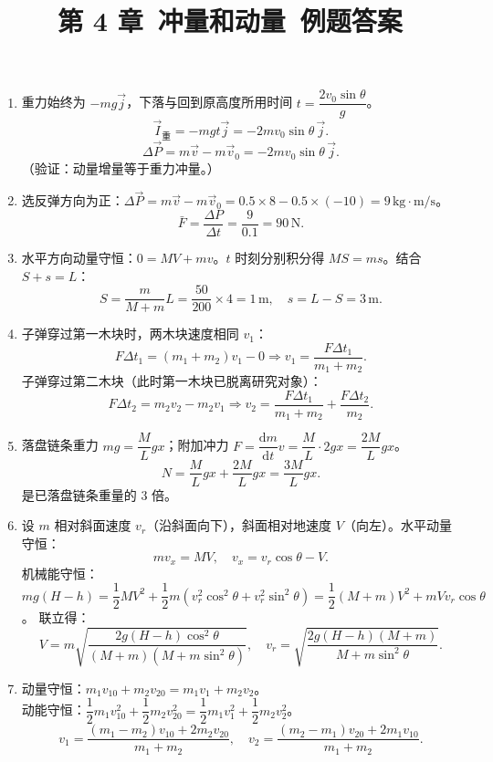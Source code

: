 \documentclass[12pt]{article}
\title{第 4 章\ 冲量和动量\ 例题答案}
\author{}
\date{}
\begin{document}
\maketitle

\begin{enumerate}[label=\textbf{例\arabic*.}, leftmargin=*]

\item 重力始终为 $-mg\vec{j}$，下落与回到原高度所用时间 $t = \dfrac{2v_0\sin\theta}{g}$。
\[
  \vec{I}_{重} = -mg t \vec{j} = -2mv_0\sin\theta\,\vec{j}.
\]
\[
  \Delta\vec{P} = m\vec{v} - m\vec{v}_0 = -2mv_0\sin\theta\,\vec{j}.
\]
（验证：动量增量等于重力冲量。）

\item 选反弹方向为正：$\Delta\vec{P} = m\vec{v} - m\vec{v}_0 = 0.5 \times 8 - 0.5 \times (-10) = 9\,\mathrm{kg\cdot m/s}$。
\[
  \bar{F} = \frac{\Delta P}{\Delta t} = \frac{9}{0.1} = 90\,\mathrm{N}.
\]

\item 水平方向动量守恒：$0 = M V + m v$。$t$ 时刻分别积分得 $MS = ms$。结合 $S + s = L$：
\[
  S = \frac{m}{M + m}L = \frac{50}{200} \times 4 = 1\,\mathrm{m},\quad s = L - S = 3\,\mathrm{m}.
\]

\item 子弹穿过第一木块时，两木块速度相同 $v_1$：
\[
  F\Delta t_1 = (m_1 + m_2)v_1 - 0 \Rightarrow v_1 = \frac{F\Delta t_1}{m_1 + m_2}.
\]
子弹穿过第二木块（此时第一木块已脱离研究对象）：
\[
  F\Delta t_2 = m_2 v_2 - m_2 v_1 \Rightarrow v_2 = \frac{F\Delta t_1}{m_1 + m_2} + \frac{F\Delta t_2}{m_2}.
\]

\item 落盘链条重力 $mg = \dfrac{M}{L}gx$；附加冲力 $F = \dfrac{\mathrm{d}m}{\mathrm{d}t}v = \dfrac{M}{L} \cdot 2gx = \dfrac{2M}{L}gx$。
\[
  N = \frac{M}{L}gx + \frac{2M}{L}gx = \frac{3M}{L}gx.
\]
是已落盘链条重量的 3 倍。

\item 设 $m$ 相对斜面速度 $v_r$（沿斜面向下），斜面相对地速度 $V$（向左）。水平动量守恒：
\[
  m v_x = M V,\quad v_x = v_r\cos\theta - V.
\]
机械能守恒：$mg(H - h) = \dfrac{1}{2}MV^2 + \dfrac{1}{2}m(v_r^2\cos^2\theta + v_r^2\sin^2\theta) = \dfrac{1}{2}(M + m)V^2 + m V v_r\cos\theta$。
联立得：
\[
  V = m\sqrt{\frac{2g(H - h)\cos^2\theta}{(M + m)(M + m\sin^2\theta)}},\quad
  v_r = \sqrt{\frac{2g(H - h)(M + m)}{M + m\sin^2\theta}}.
\]

\item 动量守恒：$m_1 v_{10} + m_2 v_{20} = m_1 v_1 + m_2 v_2$。\\
动能守恒：$\dfrac{1}{2}m_1 v_{10}^2 + \dfrac{1}{2}m_2 v_{20}^2 = \dfrac{1}{2}m_1 v_1^2 + \dfrac{1}{2}m_2 v_2^2$。
\[
  v_1 = \frac{(m_1 - m_2)v_{10} + 2m_2 v_{20}}{m_1 + m_2},\quad
  v_2 = \frac{(m_2 - m_1)v_{20} + 2m_1 v_{10}}{m_1 + m_2}.
\]


\end{enumerate}
\end{document}
